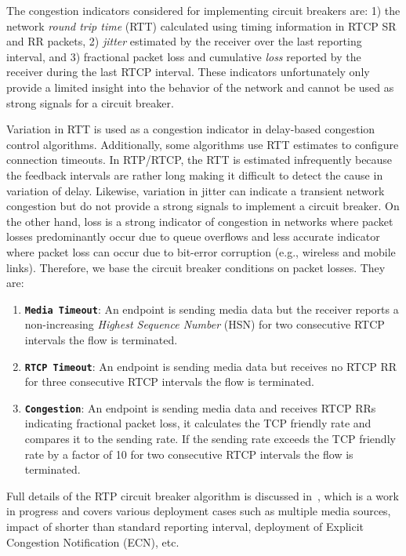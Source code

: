 The congestion indicators considered for implementing circuit breakers are: 1)
the network \emph{round trip time} (RTT) calculated  using timing information
in RTCP SR and RR packets, 2) \emph{jitter} estimated by the receiver over the
last reporting interval, and 3) fractional packet loss and cumulative
\emph{loss} reported by the receiver during the last RTCP interval. These
indicators  unfortunately only provide a limited insight into the behavior of
the network and cannot be used as strong signals for a circuit breaker.

Variation in RTT is used as a congestion indicator in delay-based congestion
control algorithms. Additionally, some algorithms use RTT estimates to
configure connection timeouts. In RTP/RTCP, the RTT is estimated infrequently
because the feedback intervals are rather long making it difficult to detect
the cause in variation of delay. Likewise, variation in jitter can indicate a
transient network congestion but do not provide a strong signals to implement
a circuit breaker. On the other hand, loss is a strong indicator of congestion
in networks where packet losses predominantly occur due to queue overflows and
less accurate indicator where packet loss can occur due to bit-error
corruption (e.g., wireless and mobile links). Therefore, we base the circuit
breaker conditions on packet losses. They are:

\begin{enumerate}
\setlength{\itemsep}{0pt}

\item \textbf{\texttt{Media Timeout}}: An endpoint is sending media data but
the receiver reports a non-increasing \emph{Highest Sequence Number} (HSN) for
two consecutive RTCP intervals the flow is terminated.

\item \textbf{\texttt{RTCP Timeout}}: An endpoint is sending media data but
receives no RTCP RR for three consecutive RTCP intervals the flow is
terminated.

\item \textbf{\texttt{Congestion}}: An endpoint is sending media data and
receives RTCP RRs indicating fractional packet loss, it calculates the TCP
friendly rate and compares it to the sending rate. If the sending rate exceeds
the TCP friendly rate  by a factor of 10 for two consecutive RTCP intervals
the flow is terminated.

\end{enumerate}

Full details of the RTP circuit breaker algorithm is discussed
in~\cite{draft.rtp.cb}, which is a work in progress and covers various
deployment cases such as multiple media sources, impact of shorter than
standard reporting interval, deployment of Explicit Congestion Notification
(ECN), etc.

